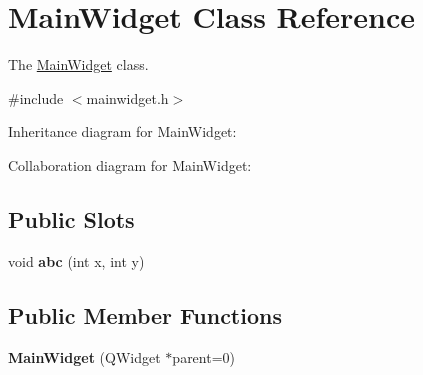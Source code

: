 \hypertarget{classMainWidget}{}\section{Main\+Widget Class Reference}
\label{classMainWidget}


The \hyperlink{classMainWidget}{Main\+Widget} class.  




{\ttfamily \#include $<$mainwidget.\+h$>$}



Inheritance diagram for Main\+Widget\+:


Collaboration diagram for Main\+Widget\+:
\subsection*{Public Slots}
\begin{DoxyCompactItemize}
\item 
\mbox{\label{classMainWidget_ae3f3317b794e8d75702c8dd351abd216}} 
void {\bfseries abc} (int x, int y)
\end{DoxyCompactItemize}
\subsection*{Public Member Functions}
\begin{DoxyCompactItemize}
\item 
\mbox{\label{classMainWidget_a326fee5088b7cebaa102ed5332dd59ee}} 
{\bfseries Main\+Widget} (Q\+Widget $\ast$parent=0)
\end{DoxyCompactItemize}
